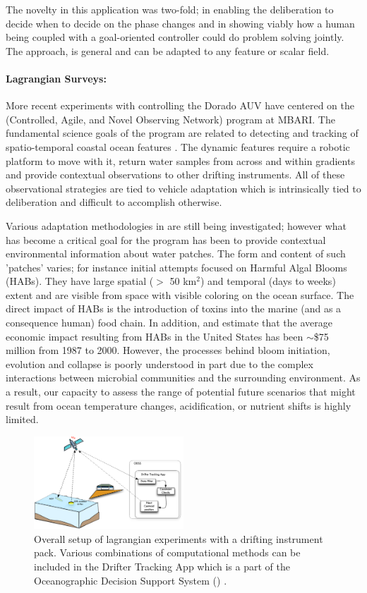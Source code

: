 The novelty in this application was two-fold; in enabling the
deliberation to decide when to decide on the phase changes and in
showing viably how a human being coupled with a goal-oriented
controller could do problem solving jointly. The approach, is general
and can be adapted to any feature or scalar field.

\paragraph {Lagrangian Surveys:} More recent experiments with \rx
controlling the Dorado AUV have centered on the \can (Controlled,
Agile, and Novel Observing Network) program at MBARI. The fundamental
science goals of the program are related to detecting and tracking of
spatio-temporal coastal ocean features \cite{canon}. The dynamic
features require a robotic platform to move with it, return water
samples from across and within gradients and provide contextual
observations to other drifting instruments. All of these observational
strategies are tied to vehicle adaptation which is intrinsically tied
to deliberation and difficult to accomplish otherwise.

Various adaptation methodologies in \can are still being
investigated; however what has become a critical goal for the program
has been to provide contextual environmental information about water
patches. The form and content of such 'patches' varies; for instance
initial attempts focused on Harmful Algal Blooms (HABs). They have
large spatial ($>$ 50 km$^2$) and temporal (days to weeks) extent and
are visible from space with visible coloring on the ocean surface. The
direct impact of HABs is the introduction of toxins into the marine
(and as a consequence human) food chain. In addition,
\cite{anderson00} and \cite{hoagland06} estimate that the average
economic impact resulting from HABs in the United States has been
$\sim$\$75 million from 1987 to 2000. However, the processes behind
bloom initiation, evolution and collapse is poorly understood in part
due to the complex interactions between microbial communities and the
surrounding environment. As a result, our capacity to assess the range
of potential future scenarios that might result from ocean temperature
changes, acidification, or nutrient shifts is highly limited.

\begin{figure}[t]
\centering
\includegraphics[width=0.5\textwidth]{figs/dta-app.pdf}
\caption{\small{Overall setup of \can lagrangian experiments with a
    drifting instrument pack. Various combinations of computational
    methods can be included in the Drifter Tracking App which is a
    part of the Oceanographic Decision Support System (\od)
    \cite{das11}.}}
\label{fig:dta-setup}
\end{figure}

